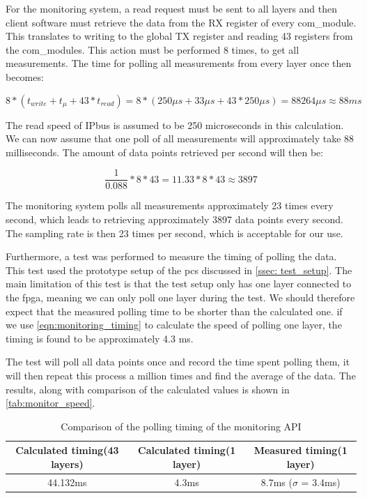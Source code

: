 \documentclass[main.tex]{subfiles}
\begin{document}
 For the monitoring system, a read request must be sent to all layers and then client software must retrieve the data from the RX register of every com\_module. This translates to writing to the global TX register and reading 43 registers from the com\_modules. This action must be performed 8 times, to get all measurements. The time for polling all measurements from every layer once then becomes:

\begin{equation} \label{eqn:monitoring_timing}
8*(t_{write}+t_{\mu } + 43*t_{read}) = 8*(250\mu s + 33 \mu s + 43*250\mu s) = 88264 \mu s \approx 88 ms
\end{equation}

The read speed of IPbus is assumed to be 250 microseconds in this calculation. We can now assume that one poll of all measurements will approximately take 88 milliseconds. The amount of data points retrieved per second will then be:

\begin{equation} \label{eqn:data_points_per_second}
\frac{1}{0.088}*8*43 =  11.33 * 8*43 \approx 3897
\end{equation}

The monitoring system polls all measurements approximately 23 times every second, which leads to retrieving approximately 3897 data points every second. The sampling rate is then 23 times per second, which is acceptable for our use.

Furthermore, a test was performed to measure the timing of polling the data. This test used the prototype setup of the \gls{pcs} discussed in \autoref{ssec: test_setup}. The main limitation of this test is that the test setup only has one layer connected to the \gls{fpga}, meaning we can only poll one layer during the test. We should therefore expect that the measured polling time to be shorter than the calculated one. if we use \autoref{eqn:monitoring_timing} to calculate the speed of polling one layer, the timing is found to be approximately 4.3 ms.

The test will poll all data points once and record the time spent polling them, it will then repeat this process a million times and find the average of the data. The results, along with comparison of the calculated values is shown in \autoref{tab:monitor_speed}.

\begin{table}[h]
\centering
\begin{tabular}{||c c c||} 
 \hline
  Calculated timing(43 layers) & Calculated timing(1 layer) & Measured timing(1 layer) \\ [0.5ex] 
 \hline\hline
    44.132ms & 4.3ms & 8.7ms ($\sigma$ = 3.4ms) \\  [1ex] 
 \hline
\end{tabular}
\caption{\label{tab:monitor_speed} Comparison of the polling timing of the monitoring API}
\end{table}
\FloatBarrier
\end{document}
